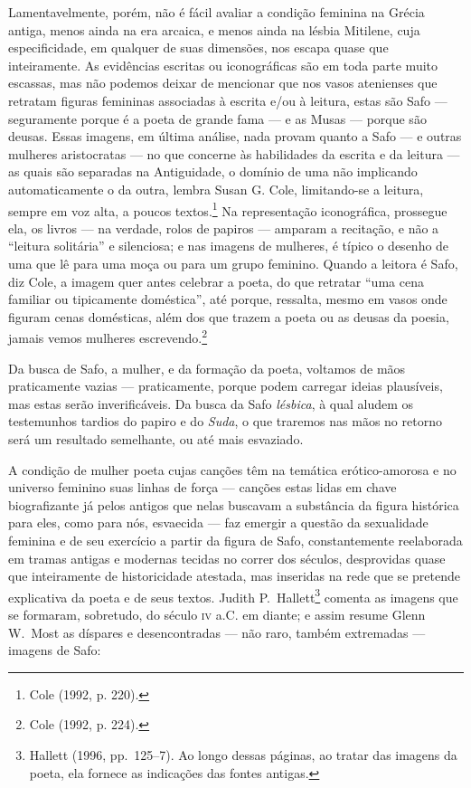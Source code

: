 Lamentavelmente, porém, não é fácil avaliar a condição feminina na Grécia
antiga, menos ainda na era arcaica, e menos ainda na lésbia Mitilene, cuja
especificidade, em qualquer de suas dimensões, nos escapa quase que
inteiramente. As evidências escritas ou iconográficas são em toda parte muito
escassas, mas não podemos deixar de mencionar que nos vasos atenienses que
retratam figuras femininas associadas à escrita e/ou à leitura, estas são Safo
--- seguramente porque é a poeta de grande fama --- e as Musas --- porque são deusas.
Essas imagens, em última análise, nada provam quanto a Safo --- e outras mulheres
aristocratas --- no que concerne às habilidades da escrita e da leitura --- as
quais são separadas na Antiguidade, o domínio de uma não implicando
automaticamente o da outra, lembra Susan G. Cole, limitando-se a
leitura, sempre em voz alta, a poucos textos.\footnote{ Cole (1992, p. 220).} Na representação iconográfica,
prossegue ela, os livros --- na verdade, rolos de papiros --- amparam a
recitação, e não a “leitura solitária” e silenciosa; e nas imagens de mulheres,
é típico o desenho de uma que lê para uma moça ou para um grupo feminino.
Quando a leitora é Safo, diz Cole, a imagem quer antes celebrar a poeta, do que
retratar “uma cena familiar ou tipicamente doméstica”, até porque, ressalta,
mesmo em vasos onde figuram cenas domésticas, além dos que trazem a poeta ou as
deusas da poesia, jamais vemos mulheres escrevendo.\footnote{ Cole (1992, p. 224).}

Da busca de Safo, a mulher, e da formação da poeta, voltamos de mãos
praticamente vazias --- praticamente, porque podem carregar ideias plausíveis,
mas estas serão inverificáveis. Da busca da Safo \textit{lésbica}, à qual
aludem os testemunhos tardios do papiro e do \textit{Suda}, o que traremos nas
mãos no retorno será um resultado semelhante, ou até mais esvaziado.

A condição de mulher poeta cujas canções têm na temática erótico-amorosa e no
universo feminino suas linhas de força --- canções estas lidas em chave
biografizante já pelos antigos que nelas buscavam a substância da figura
histórica para eles, como para nós, esvaecida --- faz emergir a questão da
sexualidade feminina e de seu exercício a partir da figura de Safo,
constantemente reelaborada em tramas antigas e modernas tecidas no correr dos
séculos, desprovidas quase que inteiramente de historicidade atestada, mas
inseridas na rede que se pretende explicativa da poeta e de seus textos. Judith
P.~Hallett\footnote{ Hallett (1996, pp.~125--7). Ao longo dessas páginas, ao tratar das
imagens da poeta, ela fornece as indicações das fontes antigas.} comenta as
imagens que se formaram, sobretudo, do século \textsc{iv} a.C. em diante; e assim resume
Glenn W.~Most as díspares e desencontradas --- não raro, também
extremadas --- imagens de Safo: 

